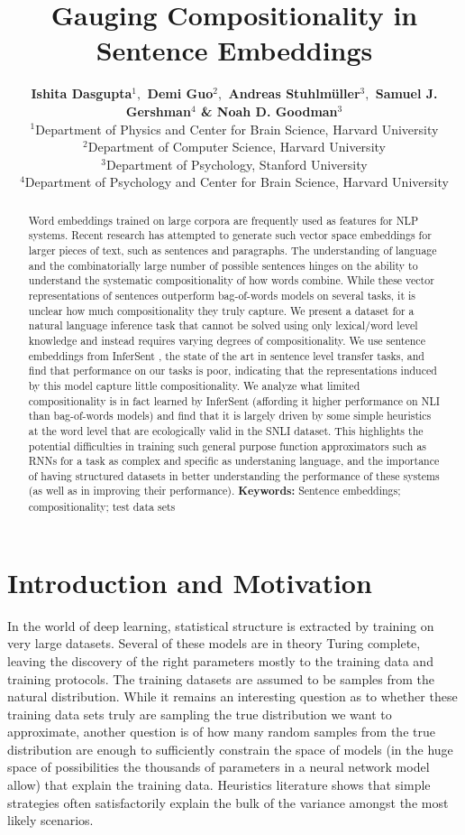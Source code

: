 \documentclass[10pt,letterpaper]{article}
\title{Gauging Compositionality in Sentence Embeddings}
\author{\textbf{Ishita Dasgupta$^1,$  Demi Guo$^2,$ Andreas Stuhlm\"uller$^3,$ Samuel J. Gershman$^4$ \& Noah D. Goodman$^3$}\medskip\\ 
$^1$Department of Physics and Center for Brain Science, Harvard University\\
$^2$Department of Computer Science, Harvard University\\
$^3$Department of Psychology, Stanford University\\
$^4$Department of Psychology and Center for Brain Science, Harvard University
}
\begin{document}
\maketitle


\begin{abstract}
Word embeddings trained on large corpora are frequently used as features for NLP systems. Recent research has attempted to generate such vector space embeddings for larger pieces of text, such as sentences and paragraphs. The understanding of language and the combinatorially large number of possible sentences hinges on the ability to understand the systematic compositionality of how words combine. While these vector representations of sentences outperform bag-of-words models on several tasks, it is unclear how much compositionality they truly capture. We present a dataset for a natural language inference task that cannot be solved using only lexical/word level knowledge and instead requires varying degrees of compositionality. We use sentence embeddings from InferSent \citep{Conneau:2017uf}, the state of the art in sentence level transfer tasks, and find that performance on our tasks is poor, indicating that the representations induced by this model capture little compositionality. We analyze what limited compositionality is in fact learned by InferSent (affording it higher performance on NLI than bag-of-words models) and find that it is largely driven by some simple heuristics at the word level that are ecologically valid in the SNLI dataset. This highlights the potential difficulties in training such general purpose function approximators such as RNNs for a task as complex and specific as understaning language, and the importance of having structured datasets in better understanding the performance of these systems (as well as in improving their performance).
\textbf{Keywords:} 
Sentence embeddings; compositionality; test data sets
\end{abstract}


\section{Introduction and Motivation}
In the world of deep learning, statistical structure is extracted by training on very large datasets. Several of these models are in theory Turing complete, leaving the discovery of the right parameters mostly to the training data and training protocols. The training datasets are assumed to be samples from the natural distribution. While it remains an interesting question as to whether these training data sets truly are sampling the true distribution we want to approximate, another question is of how many random samples from the true distribution are enough to sufficiently constrain the space of models (in the huge space of possibilities the thousands of parameters in a neural network model allow) that explain the training data. Heuristics literature shows that simple strategies often satisfactorily explain the bulk of the variance amongst the most likely scenarios.
\end{document}
